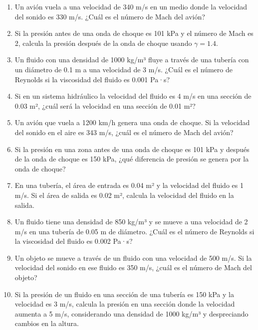 \documentclass[../main]{subfiles}
\begin{document}
\begin{enumerate}
    \item Un avión vuela a una velocidad de 340 m/s en un medio donde la velocidad del sonido es 330 m/s. ¿Cuál es el número de Mach del avión?
    \item Si la presión antes de una onda de choque es 101 kPa y el número de Mach es 2, calcula la presión después de la onda de choque usando \( \gamma = 1.4 \).
    \item Un fluido con una densidad de 1000 kg/m³ fluye a través de una tubería con un diámetro de 0.1 m a una velocidad de 3 m/s. ¿Cuál es el número de Reynolds si la viscosidad del fluido es 0.001 Pa·s?
    \item Si en un sistema hidráulico la velocidad del fluido es 4 m/s en una sección de 0.03 m², ¿cuál será la velocidad en una sección de 0.01 m²?
    \item Un avión que vuela a 1200 km/h genera una onda de choque. Si la velocidad del sonido en el aire es 343 m/s, ¿cuál es el número de Mach del avión?
    \item Si la presión en una zona antes de una onda de choque es 101 kPa y después de la onda de choque es 150 kPa, ¿qué diferencia de presión se genera por la onda de choque?
    \item En una tubería, el área de entrada es 0.04 m² y la velocidad del fluido es 1 m/s. Si el área de salida es 0.02 m², calcula la velocidad del fluido en la salida.
    \item Un fluido tiene una densidad de 850 kg/m³ y se mueve a una velocidad de 2 m/s en una tubería de 0.05 m de diámetro. ¿Cuál es el número de Reynolds si la viscosidad del fluido es 0.002 Pa·s?
    \item Un objeto se mueve a través de un fluido con una velocidad de 500 m/s. Si la velocidad del sonido en ese fluido es 350 m/s, ¿cuál es el número de Mach del objeto?
    \item Si la presión de un fluido en una sección de una tubería es 150 kPa y la velocidad es 3 m/s, calcula la presión en una sección donde la velocidad aumenta a 5 m/s, considerando una densidad de 1000 kg/m³ y despreciando cambios en la altura.

\end{enumerate}
\end{document}
